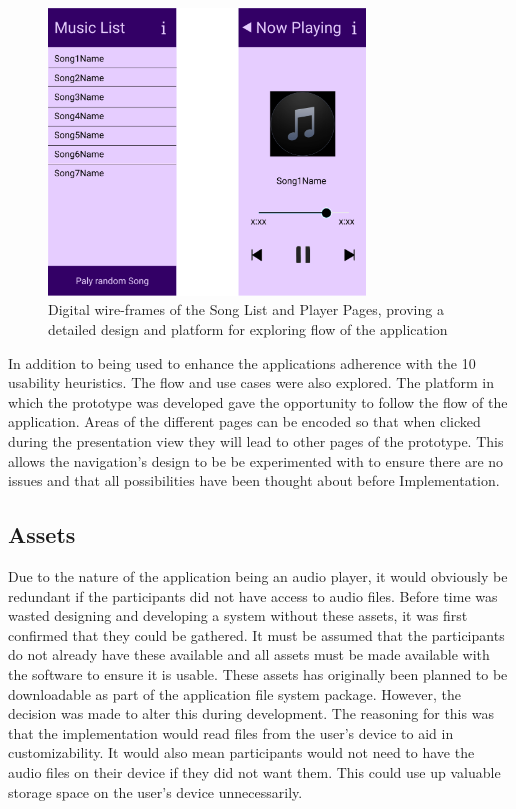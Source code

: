 \documentclass{l4proj}
\begin{document}
\begin{figure}[!htb]
    \centering
    \includegraphics[width=0.75\textwidth]{images/DigWireframes.PNG}
        \caption{Digital wire-frames of the Song List and Player Pages, proving a detailed design and platform for exploring flow of the application}
        \label{fig:digitalWF}
\end{figure}

In addition to being used to enhance the applications adherence with the 10 usability heuristics. The flow and use cases were also explored. The platform in which the prototype was developed gave the opportunity to follow the flow of the application. Areas of the different pages can be encoded so that when clicked during the presentation view they will lead to other pages of the prototype. This allows the navigation's design to be be experimented with to ensure there are no issues and that all possibilities have been thought about before Implementation.

\subsection{Assets}

Due to the nature of the application being an audio player, it would obviously be redundant if the participants did not have access to audio files. Before time was wasted designing and developing a system without these assets, it was first confirmed that they could be gathered. It must be assumed that the participants do not already have these available and all assets must be made available with the software to ensure it is usable. These assets has originally been planned to be downloadable as part of the application file system package. However, the decision was made to alter this during development. The reasoning for this was that the implementation would read files from the user’s device to aid in customizability. It would also mean participants would not need to have the audio files on their device if they did not want them. This could use up valuable storage space on the user’s device unnecessarily. 
\end{document}
